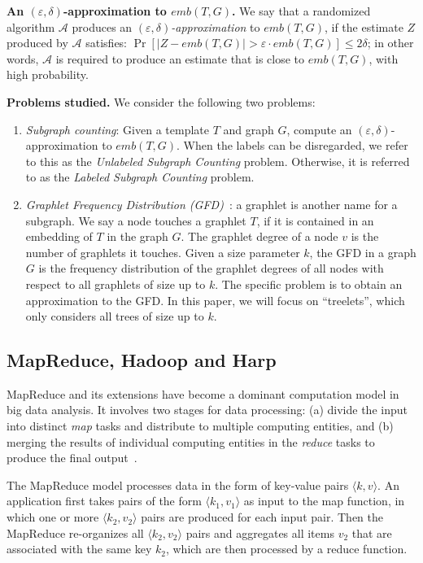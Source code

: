 \smallskip
\noindent
\textbf{An $(\varepsilon,\delta)$-approximation to $emb(T,G)$.}
We say that a randomized algorithm $\mathcal{A}$ produces an
\emph{$(\varepsilon,\delta)$-approximation} to $emb(T,G)$, if the estimate $Z$
produced by $\mathcal{A}$ satisfies: $\Pr[|Z-emb(T,G)|>\varepsilon \cdot
emb(T,G)]\leq 2\delta$; in other words, $\mathcal{A}$ is required to produce an
estimate that is close to $emb(T, G)$, with high probability.

\smallskip
\noindent
\textbf{Problems studied.}
We consider the following two problems:
\begin{enumerate}
\item
\emph{Subgraph counting}: 
Given a template $T$ and graph $G$, compute an $(\varepsilon,\delta)$-approximation to $emb(T,G)$.
When the labels can be disregarded, we refer to this as the \emph{Unlabeled Subgraph Counting}
problem. Otherwise, it is referred to as the \emph{Labeled Subgraph Counting} problem.
\item
\emph{Graphlet Frequency Distribution (GFD)}~\cite{przulj2007biological}:
a graphlet is another name for a subgraph. We say a node touches a graphlet $T$,
if it is contained in an embedding of $T$ in the graph $G$. The
graphlet degree of a node $v$ is the number of graphlets it touches.
Given a size parameter $k$, the GFD in a graph $G$ is the frequency distribution
of the graphlet degrees of all nodes with respect to all graphlets of size up to $k$. 
The specific problem is to obtain an approximation to the GFD.
In this paper, we will focus on ``treelets'', which only considers all trees of size up to $k$.
\end{enumerate}

\subsection{MapReduce, Hadoop and Harp}
\label{sec:intro-map-reduce}

MapReduce and its extensions have become a dominant computation model
in big data analysis.  It involves two stages for data processing: (a)
divide the input into distinct \emph{map} tasks and distribute to
multiple computing entities, and (b) merging the results of individual
computing entities in the \textit{reduce} tasks to produce the final
output~\cite{dean2008mapreduce}.

The MapReduce model processes data in the form of key-value pairs
$\langle k, v \rangle$. An application first takes pairs of the form
$\langle k_1, v_1 \rangle$ as input to the map function, in which one or
more $\langle k_2, v_2 \rangle$ pairs are produced for each input
pair.  Then the MapReduce re-organizes all $\langle k_2, v_2 \rangle$
pairs and aggregates all items $v_2$ that are associated with the same
key $k_2$, which are then processed by a reduce function.

